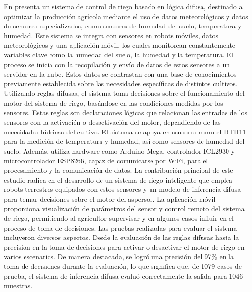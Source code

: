 \bigbreak
En \cite{noauthor_fuzzy_2023} presenta un sistema de control de riego basado en lógica difusa, destinado a optimizar la producción agrícola mediante el uso de datos meteorológicos y datos de sensores especializados, como sensores de humedad del suelo, temperatura y humedad. Este sistema se integra con sensores en robots móviles, datos meteorológicos y una aplicación móvil, los cuales monitorean constantemente variables clave como la humedad del suelo, la humedad y la temperatura. El proceso se inicia con la recopilación y envío de datos de estos sensores a un servidor en la nube. Estos datos se contrastan con una base de conocimientos previamente establecida sobre las necesidades específicas de distintos cultivos. Utilizando reglas difusas, el sistema toma decisiones sobre el funcionamiento del motor del sistema de riego, basándose en las condiciones medidas por los sensores. Estas reglas son declaraciones lógicas que relacionan las entradas de los sensores con la activación o desactivación del motor, dependiendo de las necesidades hídricas del cultivo. El sistema se apoya en sensores como el DTH11 para la medición de temperatura y humedad, así como sensores de humedad del suelo. Además, utiliza hardware como Arduino Mega, controlador ICL2930 y microcontrolador ESP8266, capaz de comunicarse por WiFi, para el procesamiento y la comunicación de datos. La contribución principal de este estudio radica en el desarrollo de un sistema de riego inteligente que emplea robots terrestres equipados con estos sensores y un modelo de inferencia difusa para tomar decisiones sobre el motor del aspersor. La aplicación móvil proporciona visualización de parámetros del sensor y control remoto del sistema de riego, permitiendo al agricultor supervisar y en algunos casos influir en el proceso de toma de decisiones. Las pruebas realizadas para evaluar el sistema incluyeron diversos aspectos. Desde la evaluación de las reglas difusas hasta la precisión en la toma de decisiones para activar o desactivar el motor de riego en varios escenarios. De manera destacada, se logró una precisión del 97\% en la toma de decisiones durante la evaluación, lo que significa que, de 1079 casos de prueba, el sistema de inferencia difusa evaluó correctamente la salida para 1046 muestras.

